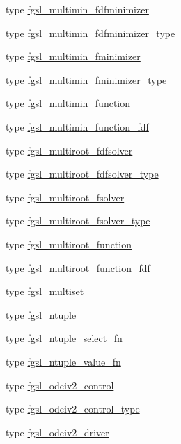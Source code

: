 \begin{DoxyCompactItemize}
type \hyperlink{structfgsl_1_1fgsl__multimin__fdfminimizer}{fgsl\-\_\-multimin\-\_\-fdfminimizer}
\item 
type \hyperlink{structfgsl_1_1fgsl__multimin__fdfminimizer__type}{fgsl\-\_\-multimin\-\_\-fdfminimizer\-\_\-type}
\item 
type \hyperlink{structfgsl_1_1fgsl__multimin__fminimizer}{fgsl\-\_\-multimin\-\_\-fminimizer}
\item 
type \hyperlink{structfgsl_1_1fgsl__multimin__fminimizer__type}{fgsl\-\_\-multimin\-\_\-fminimizer\-\_\-type}
\item 
type \hyperlink{structfgsl_1_1fgsl__multimin__function}{fgsl\-\_\-multimin\-\_\-function}
\item 
type \hyperlink{structfgsl_1_1fgsl__multimin__function__fdf}{fgsl\-\_\-multimin\-\_\-function\-\_\-fdf}
\item 
type \hyperlink{structfgsl_1_1fgsl__multiroot__fdfsolver}{fgsl\-\_\-multiroot\-\_\-fdfsolver}
\item 
type \hyperlink{structfgsl_1_1fgsl__multiroot__fdfsolver__type}{fgsl\-\_\-multiroot\-\_\-fdfsolver\-\_\-type}
\item 
type \hyperlink{structfgsl_1_1fgsl__multiroot__fsolver}{fgsl\-\_\-multiroot\-\_\-fsolver}
\item 
type \hyperlink{structfgsl_1_1fgsl__multiroot__fsolver__type}{fgsl\-\_\-multiroot\-\_\-fsolver\-\_\-type}
\item 
type \hyperlink{structfgsl_1_1fgsl__multiroot__function}{fgsl\-\_\-multiroot\-\_\-function}
\item 
type \hyperlink{structfgsl_1_1fgsl__multiroot__function__fdf}{fgsl\-\_\-multiroot\-\_\-function\-\_\-fdf}
\item 
type \hyperlink{structfgsl_1_1fgsl__multiset}{fgsl\-\_\-multiset}
\item 
type \hyperlink{structfgsl_1_1fgsl__ntuple}{fgsl\-\_\-ntuple}
\item 
type \hyperlink{structfgsl_1_1fgsl__ntuple__select__fn}{fgsl\-\_\-ntuple\-\_\-select\-\_\-fn}
\item 
type \hyperlink{structfgsl_1_1fgsl__ntuple__value__fn}{fgsl\-\_\-ntuple\-\_\-value\-\_\-fn}
\item 
type \hyperlink{structfgsl_1_1fgsl__odeiv2__control}{fgsl\-\_\-odeiv2\-\_\-control}
\item 
type \hyperlink{structfgsl_1_1fgsl__odeiv2__control__type}{fgsl\-\_\-odeiv2\-\_\-control\-\_\-type}
\item 
type \hyperlink{structfgsl_1_1fgsl__odeiv2__driver}{fgsl\-\_\-odeiv2\-\_\-driver}

\end{DoxyCompactItemize}
